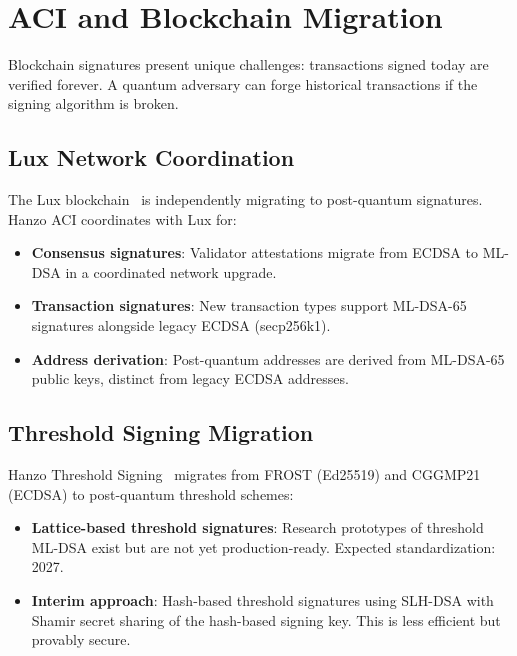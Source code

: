 \section{ACI and Blockchain Migration}

\label{sec:blockchain}

Blockchain signatures present unique challenges: transactions signed today are
verified forever. A quantum adversary can forge historical transactions if the
signing algorithm is broken.

\subsection{Lux Network Coordination}

The Lux blockchain~\cite{luxwhitepaper} is independently migrating to
post-quantum signatures. Hanzo ACI coordinates with Lux for:
\begin{itemize}[leftmargin=1.1em]
    \item \textbf{Consensus signatures}: Validator attestations migrate from
    ECDSA to ML-DSA in a coordinated network upgrade.
    \item \textbf{Transaction signatures}: New transaction types support
    ML-DSA-65 signatures alongside legacy ECDSA (secp256k1).
    \item \textbf{Address derivation}: Post-quantum addresses are derived from
    ML-DSA-65 public keys, distinct from legacy ECDSA addresses.
\end{itemize}

\subsection{Threshold Signing Migration}

Hanzo Threshold Signing~\cite{hanzothreshold} migrates from FROST (Ed25519)
and CGGMP21 (ECDSA) to post-quantum threshold schemes:
\begin{itemize}[leftmargin=1.1em]
    \item \textbf{Lattice-based threshold signatures}: Research prototypes of
    threshold ML-DSA exist but are not yet production-ready. Expected
    standardization: 2027.
    \item \textbf{Interim approach}: Hash-based threshold signatures using
    SLH-DSA with Shamir secret sharing of the hash-based signing key. This
    is less efficient but provably secure.
\end{itemize}


